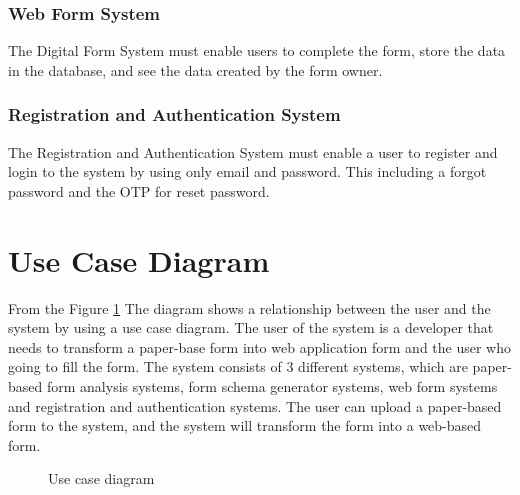 \documentclass[12pt,oneside,openright,a4paper]{cpe-english-project}
\begin{document}
\subsubsection{Web Form System}

The Digital Form System must enable users to complete the form, store the data in the database, and see the data created by the form owner.

\subsubsection{Registration and Authentication System}

The Registration and Authentication System must enable a user to register and login to the system by using only email and password. This including a forgot password and the  OTP for reset password.	

\section{Use Case Diagram}

From the Figure \ref{fig:use-case} The diagram shows a relationship between the user and the system by using a use case diagram. The user of the system is a developer that needs to transform a paper-base form into web application form and the user who going to fill the form. The system consists of 3 different systems, which are paper-based form analysis systems, form schema generator systems, web form systems and registration and authentication systems. The user can upload a paper-based form to the system, and the system will transform the form into a web-based form.

\begin{figure}[!h]
\centering
{}
\caption{Use case diagram}\label{fig:use-case}
\end{figure}
\end{document}
